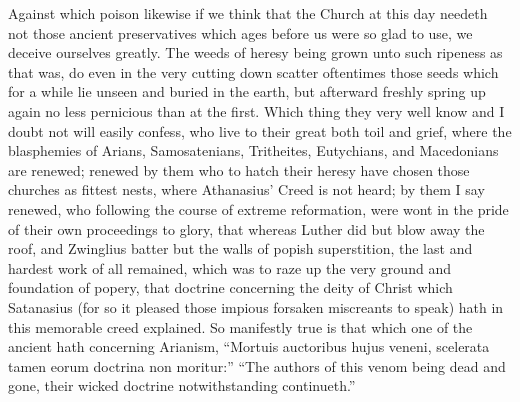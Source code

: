 Against which poison likewise if we think that the Church at this day needeth not those ancient preservatives which ages before us were so glad to use, we deceive ourselves greatly. The weeds of heresy being grown unto such ripeness as that was, do even in the very cutting down scatter oftentimes those seeds which for a while lie unseen and buried in the earth, but afterward freshly spring up again no less pernicious than at the first. Which thing they very well know and I doubt not will easily confess, who live to their great both toil and grief, where the blasphemies of Arians, Samosatenians, Tritheites, Eutychians, and Macedonians are renewed;  renewed by them who to hatch their heresy have chosen those churches as fittest nests, where Athanasius’ Creed is not heard; by them I say renewed, who following the course of extreme reformation, were wont in the pride of their own proceedings to glory, that whereas Luther did but blow away  the roof, and Zwinglius batter but the walls of popish superstition, the last and hardest work of all remained, which was to raze up the very ground and foundation of popery, that doctrine concerning the deity of Christ which Satanasius (for so it pleased those impious forsaken miscreants to speak) hath in this memorable creed explained. So manifestly true is that which one of the ancient hath concerning Arianism, “Mortuis auctoribus hujus veneni, scelerata tamen eorum doctrina non moritur:” “The authors of this venom being dead and gone, their wicked doctrine notwithstanding continueth.”

